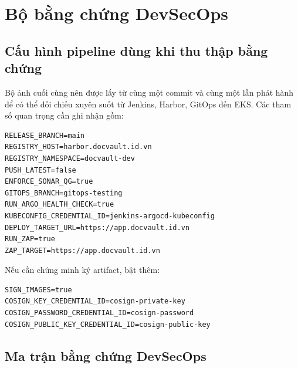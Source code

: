 \chapter{Bộ bằng chứng DevSecOps}

\section{Cấu hình pipeline dùng khi thu thập bằng chứng}

Bộ ảnh cuối cùng nên được lấy từ cùng một commit và cùng một lần phát hành để có thể đối chiếu xuyên suốt từ Jenkins, Harbor, GitOps đến EKS. Các tham số quan trọng cần ghi nhận gồm:

\begin{lstlisting}
RELEASE_BRANCH=main
REGISTRY_HOST=harbor.docvault.id.vn
REGISTRY_NAMESPACE=docvault-dev
PUSH_LATEST=false
ENFORCE_SONAR_QG=true
GITOPS_BRANCH=gitops-testing
RUN_ARGO_HEALTH_CHECK=true
KUBECONFIG_CREDENTIAL_ID=jenkins-argocd-kubeconfig
DEPLOY_TARGET_URL=https://app.docvault.id.vn
RUN_ZAP=true
ZAP_TARGET=https://app.docvault.id.vn
\end{lstlisting}

Nếu cần chứng minh ký artifact, bật thêm:

\begin{lstlisting}
SIGN_IMAGES=true
COSIGN_KEY_CREDENTIAL_ID=cosign-private-key
COSIGN_PASSWORD_CREDENTIAL_ID=cosign-password
COSIGN_PUBLIC_KEY_CREDENTIAL_ID=cosign-public-key
\end{lstlisting}

\section{Ma trận bằng chứng DevSecOps}

